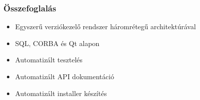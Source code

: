 \documentclass[hyperref={pdfpagelabels=false}]{beamer}
\begin{document}
\begin{frame}
\frametitle{Összefoglalás}
\begin{itemize}
\item Egyszerű verziókezelő rendszer háromrétegű architektúrával
\item SQL, CORBA és Qt alapon
\item Automatizált tesztelés
\item Automatizált API dokumentáció
\item Automatizált installer készítés
\end{itemize}
\end{frame}
\end{document}
